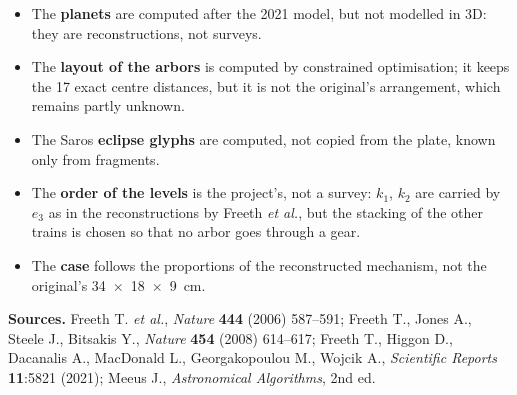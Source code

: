 \begin{attention}
\begin{itemize}
  \item The \textbf{planets} are computed after the 2021 model, but not modelled in 3D: they
        are reconstructions, not surveys.
  \item The \textbf{layout of the arbors} is computed by constrained optimisation; it keeps the
        17 exact centre distances, but it is not the original's arrangement, which remains
        partly unknown.
  \item The Saros \textbf{eclipse glyphs} are computed, not copied from the plate, known only
        from fragments.
  \item The \textbf{order of the levels} is the project's, not a survey: $k_1$, $k_2$ are
        carried by $e_3$ as in the reconstructions by Freeth \textit{et al.}, but the stacking
        of the other trains is chosen so that no arbor goes through a gear.
  \item The \textbf{case} follows the proportions of the reconstructed mechanism, not the
        original's 34~$\times$~18~$\times$~9~cm.
\end{itemize}
\end{attention}

\vfill
\begin{tcolorbox}[enhanced,colback=parchemin,colframe=summit,arc=2mm,boxrule=0.6pt]
\small
\textbf{Sources.} Freeth T. \textit{et al.}, \textit{Nature} \textbf{444} (2006) 587–591;
Freeth T., Jones A., Steele J., Bitsakis Y., \textit{Nature} \textbf{454} (2008) 614–617;
Freeth T., Higgon D., Dacanalis A., MacDonald L., Georgakopoulou M., Wojcik A.,
\textit{Scientific Reports} \textbf{11}:5821 (2021); Meeus J., \textit{Astronomical
Algorithms}, 2nd ed.
\end{tcolorbox}


